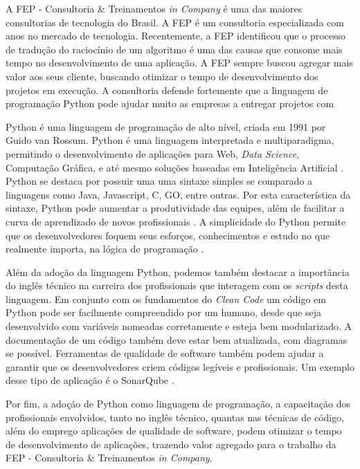A FEP - Consultoria \& Treinamentos \textit{in Company} é uma das maiores consultorias de tecnologia do Brasil. A FEP é um consultoria especializada com anos no mercado de tecnologia. Recentemente, a FEP identificou que o processo de tradução do raciocínio de um algoritmo é uma das causas que consome mais tempo no desenvolvimento de uma aplicação. A FEP sempre buscou agregar mais valor aos seus cliente, buscando otimizar o tempo de desenvolvimento dos projetos em execução. A consultoria defende fortemente que a linguagem de programação Python pode ajudar muito as empresas a entregar projetos com 

Python é uma linguagem de programação de alto nível, criada em 1991 por Guido van Rossum. Python é uma linguagem interpretada e multiparadigma, permitindo o desenvolvimento de aplicações para Web, \textit{Data Science}, Computação Gráfica, e até mesmo soluções baseadas em Inteligência Artificial \cite{millman2011python}. Python se destaca por possuir uma uma sintaxe simples se comparado a linguagens como Java, Javascript, C, GO, entre outras. Por esta característica da sintaxe, Python pode aumentar a produtividade das equipes, além de facilitar a curva de aprendizado de novos profissionais \cite{ranum2006successful}. A simplicidade do Python permite que os desenvolvedores foquem seus esforços, conhecimentos e estudo no que realmente importa, na lógica de programação \cite{da2019linguagem}.

Além da adoção da linguagem Python, podemos também destacar a importância do inglês técnico na carreira dos profissionais que interagem com os \textit{scripts} desta linguagem. Em conjunto com os fundamentos do \textit{Clean Code} \cite{martin2013clean} um código em Python pode ser facilmente compreendido por um humano, desde que seja desenvolvido com variáveis nomeadas corretamente e esteja bem modularizado. A documentação de um código também deve estar bem atualizada, com diagramas se possível. Ferramentas de qualidade de software também podem ajudar a garantir que os desenvolvedores criem códigos legíveis e profissionais. Um exemplo desse tipo de aplicação é o SonarQube \cite{marcilio2019static}. 

Por fim, a adoção de Python como linguagem de programação, a capacitação dos profissionais envolvidos, tanto no inglês técnico, quantas nas técnicas de código, além do emprego aplicações de qualidade de software, podem otimizar o tempo de desenvolvimento de aplicações, trazendo valor agregado para o trabalho da FEP - Consultoria \& Treinamentos \textit{in Company}.